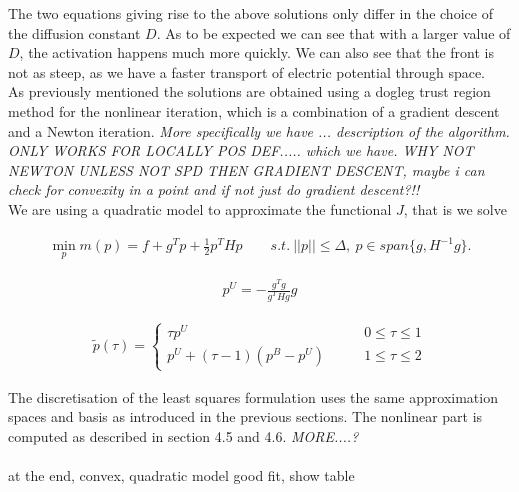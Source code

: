 \documentclass[../draft_1.tex]{subfiles}
\begin{document}
The two equations giving rise to the above solutions only differ in the choice of the diffusion constant $D$. As to be expected we can see that with a larger value of $D$, the activation happens much more quickly. We can also see that the front is not as steep, as we have a faster transport of electric potential through space. 
\smallskip
\\
As previously mentioned the solutions are obtained using a dogleg trust region method for the nonlinear iteration, which is a combination of a gradient descent and a Newton iteration. \textit{More specifically we have ... description of the algorithm. ONLY WORKS FOR LOCALLY POS DEF.....	which we have. WHY NOT NEWTON UNLESS NOT SPD THEN GRADIENT DESCENT, maybe i can check for convexity in a point and if not just do gradient descent?!!} 	
\smallskip
\\
We are using a quadratic model to approximate the functional $J$, that is we solve

\begin{ceqn}
	\begin{equation}
	\begin{aligned}
\min_p m(p) = f + g^T p + \frac{1}{2} p^T H p \qquad s.t. \ ||p|| \leq \Delta, \ p \in span\{g, H^{-1}g\}. 
	\end{aligned}
	\end{equation}
\end{ceqn}

\begin{ceqn}
	\begin{equation}
	\begin{aligned}
p^U = - \frac{g^Tg}{g^T H g} g
	\end{aligned}
	\end{equation}
\end{ceqn}

\begin{ceqn}
	\begin{equation}
	\begin{aligned}
	\tilde{p}(\tau) = \begin{cases}
	\tau p^U \qquad &0 \leq \tau \leq 1 \\
	p^U + (\tau - 1)(p^B - p^U) \qquad &1 \leq \tau \leq 2
	\end{cases}
	\end{aligned}
	\end{equation}
\end{ceqn}

 
The discretisation of the least squares formulation uses the same approximation spaces and basis as introduced in the previous sections. The nonlinear part is computed as described in section 4.5 and 4.6. \textit{MORE....?}
\smallskip
\\
\\
at the end, convex, quadratic model good fit, show table
\end{document}
